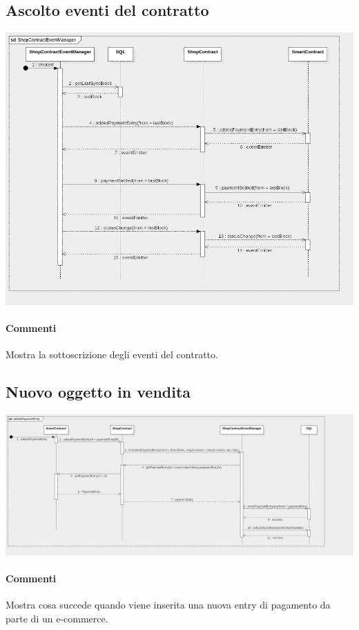 \documentclass[a4paper, 12pt]{article}
\begin{document}
\subsection{Ascolto eventi del contratto}
\includegraphics[width=1.0\textwidth]{shopContractEventManager}
\paragraph{Commenti}
Mostra la sottoscrizione degli eventi del contratto.

\subsection{Nuovo oggetto in vendita}
\includegraphics[width=1.0\textwidth]{addedPaymentEntry}
\paragraph{Commenti}
Mostra cosa succede quando viene inserita una nuova entry di pagamento da parte di un e-commerce.
\end{document}
